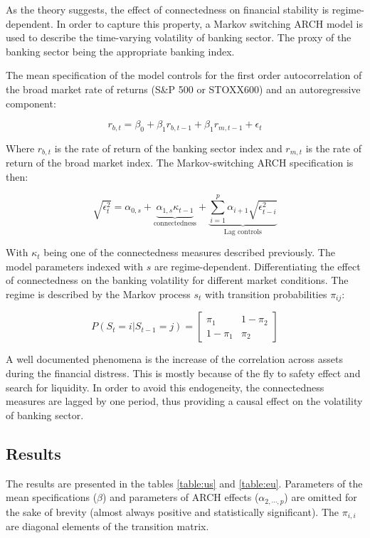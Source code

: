 \documentclass{article}
\begin{document}
As the theory suggests, the effect of connectedness on financial stability is regime-dependent. In order to capture this property, a Markov switching ARCH model is used to describe the time-varying volatility of banking sector. The proxy of the banking sector being the appropriate banking index.

The mean specification of the model controls for the first order autocorrelation of the broad market rate of returns (S\&P 500 or STOXX600) and an autoregressive component:

\[r_{b,t} = \beta_0 + \beta_1 r_{b,t-1} + \beta_1 r_{m,t-1} + \epsilon_t\]

Where $r_{b,t}$ is the rate of return of the banking sector index and $r_{m,t}$ is the rate of return of the broad market index. The Markov-switching ARCH specification is then:

\[\sqrt{\epsilon^2_t} = \alpha_{0,s} + \underbrace{\alpha_{1,s}\kappa_{t-1}}_{\text{connectedness}} + \underbrace{\sum_{i=1}^{p} \alpha_{i+1} \sqrt{\epsilon^2_{t-i}}}_{\text{Lag controls}}\]

With $\kappa_t$ being one of the connectedness measures described previously. The model parameters indexed with $s$ are regime-dependent. Differentiating the effect of connectedness on the banking volatility for different market conditions. The regime is described by the Markov process $s_t$ with transition probabilities $\pi_{ij}$:

\begin{equation*}
  P(S_t = i | S_{t-1} = j) = \begin{bmatrix}
    \pi_1 & 1 - \pi_2\\
      1 - \pi_1 & \pi_2
      \end{bmatrix}
\end{equation*}

A well documented phenomena is the increase of the correlation across assets during the financial distress. This is mostly because of the fly to safety effect and search for liquidity. In order to avoid this endogeneity, the connectedness measures are lagged by one period, thus providing a causal effect on the volatility of banking sector.

\subsection*{Results}

The results are presented in the tables \ref{table:us} and \ref{table:eu}. Parameters of the mean specifications ($\beta$) and parameters of ARCH effects ($\alpha_{2,\cdots,p}$) are omitted for the sake of brevity (almost always positive and statistically significant). The $\pi_{i,i}$ are diagonal elements of the transition matrix.
\end{document}

